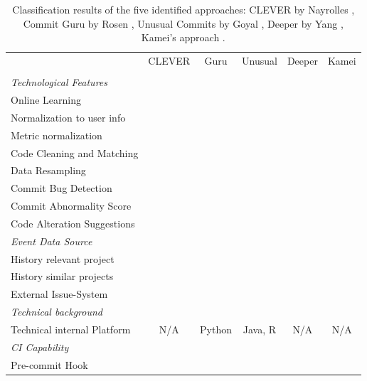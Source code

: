 \begin{table}[p]
	\centering
	\caption{Classification results of the five identified approaches: CLEVER by Nayrolles \cite{Nayrolles2018}, Commit Guru by Rosen \cite{Rosen2015}, Unusual Commits by Goyal \cite{Goyal2017}, Deeper by Yang \cite{Yang2015}, Kamei's approach \cite{Kamei2013}.}
	\begin{tabular}{@{}lccccc@{}}
		\toprule
		& CLEVER & Guru & Unusual & Deeper & Kamei \\ 
		& \cite{Nayrolles2018} & \cite{Rosen2015} & \cite{Goyal2017} & \cite{Yang2015} & \cite{Kamei2013} \\ \midrule
		\textit{Technological Features} & & & & & \\ 
		Online Learning & \pointyes & \pointyes & \pointyes & \pointyes & \pointno \\
		Normalization to user info & \pointno & \pointno & \pointyes & \pointno & \pointno \\
		Metric normalization & \pnotapplicable & \pnotapplicable & \pointyes & \pointyes & \pointyes \\
		Code Cleaning and Matching & \pointyes & \pointno & \pointno & \pointno & \pointno \\
		Data Resampling & \pnotapplicable & \pnotapplicable & \pointno & \pointyes & \pointyes \\
		Commit Bug Detection & \pointyes & \pointyes & \pointno & \pointyes & \pointyes \\
		Commit Abnormality Score & \pointno & \pointno & \pointyes & \pointno & \pointno \\
		Code Alteration Suggestions & \pointyes & \pointno & \pointno & \pointno & \pointno \\ \midrule
		\textit{Event Data Source} & & & & & \\
		History relevant project & \pointyes & \pointyes & \pointyes & \pointyes & \pointyes \\
		History similar projects & \pointyes & \pointno & \pointno & \pointno & \pointno \\
		External Issue-System & \pointyes & \pointno & \pointno & \pointyes & \pointyes \\ \midrule
		\textit{Technical background} & & & & & \\
		Technical internal Platform & N/A & Python & Java, R & N/A & N/A \\ \midrule
		\textit{CI Capability} & & & & & \\
		Pre-commit Hook & \pointyes & \pointno & \pointno & \pnotapplicable & \pnotapplicable \\

\end{tabular}
\end{table}
